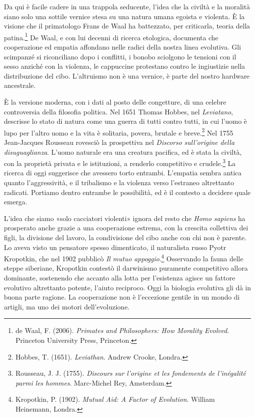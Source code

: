 Da qui è facile cadere in una trappola seducente, l'idea che la civiltà e la moralità siano solo una sottile vernice stesa su una natura umana egoista e violenta. È la visione che il primatologo Frans de Waal ha battezzato, per criticarla, teoria della patina.\footnote{de Waal, F. (2006). \textit{Primates and Philosophers: How Morality Evolved}. Princeton University Press, Princeton.} De Waal, e con lui decenni di ricerca etologica, documenta che cooperazione ed empatia affondano nelle radici della nostra linea evolutiva. Gli scimpanzé si riconciliano dopo i conflitti, i bonobo sciolgono le tensioni con il sesso anziché con la violenza, le cappuccine protestano contro le ingiustizie nella distribuzione del cibo. L'altruismo non è una vernice, è parte del nostro hardware ancestrale.

È la versione moderna, con i dati al posto delle congetture, di una celebre controversia della filosofia politica. Nel 1651 Thomas Hobbes, nel \textit{Leviatano}, descrisse lo stato di natura come una guerra di tutti contro tutti, in cui l'uomo è lupo per l'altro uomo e la vita è solitaria, povera, brutale e breve.\footnote{Hobbes, T. (1651). \textit{Leviathan}. Andrew Crooke, Londra.} Nel 1755 Jean-Jacques Rousseau rovesciò la prospettiva nel \textit{Discorso sull'origine della disuguaglianza}. L'uomo naturale era una creatura pacifica, ed è stata la civiltà, con la proprietà privata e le istituzioni, a renderlo competitivo e crudele.\footnote{Rousseau, J. J. (1755). \textit{Discours sur l'origine et les fondements de l'inégalité parmi les hommes}. Marc-Michel Rey, Amsterdam.} La ricerca di oggi suggerisce che avessero torto entrambi. L'empatia sembra antica quanto l'aggressività, e il tribalismo e la violenza verso l'estraneo altrettanto radicati. Portiamo dentro entrambe le possibilità, ed è il contesto a decidere quale emerga.

L'idea che siamo «solo cacciatori violenti» ignora del resto che \textit{Homo sapiens} ha prosperato anche grazie a una cooperazione estrema, con la crescita collettiva dei figli, la divisione del lavoro, la condivisione del cibo anche con chi non è parente. Lo aveva visto un pensatore spesso dimenticato, il naturalista russo Pyotr Kropotkin, che nel 1902 pubblicò \textit{Il mutuo appoggio}.\footnote{Kropotkin, P. (1902). \textit{Mutual Aid: A Factor of Evolution}. William Heinemann, Londra.} Osservando la fauna delle steppe siberiane, Kropotkin contestò il darwinismo puramente competitivo allora dominante, sostenendo che accanto alla lotta per l'esistenza agisce un fattore evolutivo altrettanto potente, l'aiuto reciproco. Oggi la biologia evolutiva gli dà in buona parte ragione. La cooperazione non è l'eccezione gentile in un mondo di artigli, ma uno dei motori dell'evoluzione.

